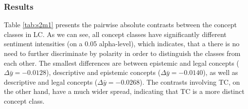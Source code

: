 \documentclass{article}
\begin{document}

\subsubsection{Results}


Table \ref{tab:s2m1} presents the pairwise absolute contrasts between the concept classes in LC. As we can see, all concept classes have significantly different sentiment intensities (on a 0.05 alpha-level), which indicates, that a there is no need to further discriminate by polarity in order to distinguish the classes from each other. The smallest differences are between epistemic and legal concepts ($\Delta\bar{y}=-0.0128$), descriptive and epistemic concepts ($\Delta\bar{y}=-0.0140$), as well as descriptive and legal concepts ($\Delta\bar{y}=-0.0268$). The contrasts involving TC, on the other hand, have a much wider spread, indicating that TC is a more distinct concept class. %
\end{document}
